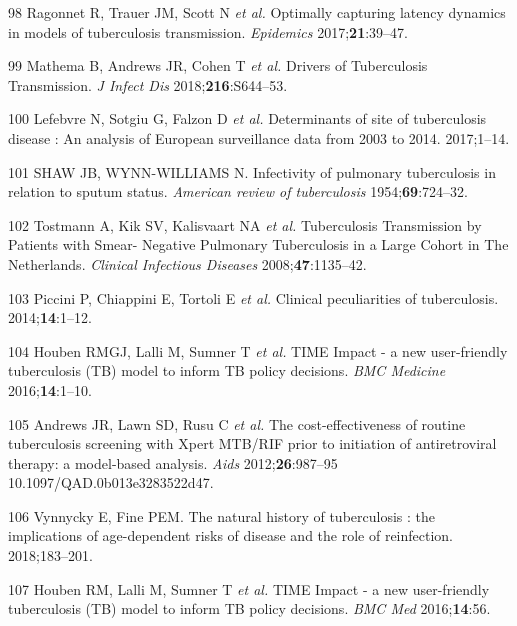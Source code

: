 \documentclass[11pt,twoside]{bristolthesis}
\begin{document}
  \leavevmode\hypertarget{ref-Ragonnet2017}{}%
  98 Ragonnet R, Trauer JM, Scott N \emph{et al.} Optimally capturing latency dynamics in models of tuberculosis transmission. \emph{Epidemics} 2017;\textbf{21}:39--47.
  
  \leavevmode\hypertarget{ref-Mathema2018}{}%
  99 Mathema B, Andrews JR, Cohen T \emph{et al.} Drivers of Tuberculosis Transmission. \emph{J Infect Dis} 2018;\textbf{216}:S644--53.
  
  \leavevmode\hypertarget{ref-Lefebvre2017}{}%
  100 Lefebvre N, Sotgiu G, Falzon D \emph{et al.} Determinants of site of tuberculosis disease : An analysis of European surveillance data from 2003 to 2014. 2017;1--14.
  
  \leavevmode\hypertarget{ref-PMID:13148535}{}%
  101 SHAW JB, WYNN-WILLIAMS N. Infectivity of pulmonary tuberculosis in relation to sputum status. \emph{American review of tuberculosis} 1954;\textbf{69}:724--32.
  
  \leavevmode\hypertarget{ref-Tostmann2008}{}%
  102 Tostmann A, Kik SV, Kalisvaart NA \emph{et al.} Tuberculosis Transmission by Patients with Smear- Negative Pulmonary Tuberculosis in a Large Cohort in The Netherlands. \emph{Clinical Infectious Diseases} 2008;\textbf{47}:1135--42.
  
  \leavevmode\hypertarget{ref-Piccini2014}{}%
  103 Piccini P, Chiappini E, Tortoli E \emph{et al.} Clinical peculiarities of tuberculosis. 2014;\textbf{14}:1--12.
  
  \leavevmode\hypertarget{ref-Houben2016}{}%
  104 Houben RMGJ, Lalli M, Sumner T \emph{et al.} TIME Impact - a new user-friendly tuberculosis (TB) model to inform TB policy decisions. \emph{BMC Medicine} 2016;\textbf{14}:1--10.
  
  \leavevmode\hypertarget{ref-Andrews2012}{}%
  105 Andrews JR, Lawn SD, Rusu C \emph{et al.} The cost-effectiveness of routine tuberculosis screening with Xpert MTB/RIF prior to initiation of antiretroviral therapy: a model-based analysis. \emph{Aids} 2012;\textbf{26}:987--95 10.1097/QAD.0b013e3283522d47.
  
  \leavevmode\hypertarget{ref-Vynnycky1997}{}%
  106 Vynnycky E, Fine PEM. The natural history of tuberculosis : the implications of age-dependent risks of disease and the role of reinfection. 2018;183--201.
  
  \leavevmode\hypertarget{ref-Houben2016a}{}%
  107 Houben RM, Lalli M, Sumner T \emph{et al.} TIME Impact - a new user-friendly tuberculosis (TB) model to inform TB policy decisions. \emph{BMC Med} 2016;\textbf{14}:56.
  
\end{document}
